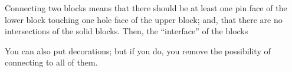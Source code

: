Connecting two blocks means that there should be at least one pin face of the lower block touching one hole face of the upper block; and, that there are no intersections of the solid blocks. Then, the ``interface'' of the blocks


You can also put decorations; but if you do, you remove the possibility of connecting to all of them.



